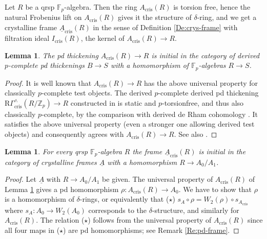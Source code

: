 \documentclass[a4paper,11pt]{amsart}
\theoremstyle{plain}
\newtheorem{Lemma}[equation]{Lemma}
\theoremstyle{definition}
\theoremstyle{remark}
\newcommand{\bLe}{\begin{Lemma}}
\newcommand{\eLe}{\end{Lemma}}
\newcommand{\bproof}{\begin{proof}}
\newcommand{\eproof}{\end{proof}}
\renewcommand{\u}{\underline}
\numberwithin{equation}{section}
\newcommand{\FF}{{\mathbb{F}}}
\newcommand{\ZZ}{{\mathbb{Z}}}
\DeclareMathOperator{\crys}{cris}
\begin{document}
Let $R$ be a qrsp $\FF_p$-algebra. Then the ring $A_{\crys}(R)$ is torsion free, hence the natural Frobenius lift on $A_{\crys}(R)$ gives it the structure of $\delta$-ring, and we get a crystalline frame $\u A_{\crys}(R)$ in the sense of Definition \ref{De:crys-frame} with filtration ideal $I_{\crys}(R)$, the kernel of $A_{\crys}(R)\to R$. 

\bLe
\label{Le:Acrys-universal-derived}
The pd thickening $A_{\crys}(R)\to R$ is initial in the category of derived $p$-complete pd thickenings $B\to S$ with a homomorphism of $\FF_p$-algebras $R\to S$.
\eLe

\bproof
It is well known that $A_{\crys}(R) \to R$ has the above universal property
for classically $p$-complete test objects.
The derived $p$-complete derived pd thickening $\mathrm{R}
\Gamma_{\crys}^{\wedge}(R/\ZZ_p) \to R$ constructed in \cite[Definition
4.3.1 and Example 4.3.3]{Magidson:Divided} is static and $p$-torsionfree, and thus also classically $p$-complete, by the comparison with derived de Rham cohomology
\cite[Corollary 4.3.5.1]{Magidson:Divided}.
It satisfies the above universal property (even a stronger one allowing
derived test objects) and consequently agrees with $A_{\crys}(R) \to R$.
See also \cite[Theorem 8.8]{Mathew:Some-recent}.
\eproof

\bLe
\label{Le:Acris-initial-pd-frame}
For every qrsp $\FF_p$-algebra $R$ the frame $\u A_{\crys}(R)$ is initial in the category of crystalline frames $\u A$ with a homomorphism $R\to A_0/A_1$.
\eLe

\bproof
Let $\u A$ with $R\to A_0/A_1$ be given. The universal property of $A_{\crys}(R)$ of Lemma \ref{Le:Acrys-universal-derived} gives a pd homomorphism $\rho\colon A_{\crys}(R)\to A_0$. We have to show that $\rho$ is a homomorphism of $\delta$-rings, or equivalently that ($\star$) $s_A\circ\rho=W_2(\rho)\circ s_{A_{\crys}}$ where $s_A\colon A_0\to W_2(A_0)$ corresponds to the $\delta$-structure, and similarly for $A_{\crys}(R)$. The relation ($\star$) follows from the universal property of $A_{\crys}(R)$ since all four maps in ($\star$) are pd homomorphisms; see Remark \ref{Re:pd-frame}.
\eproof
\end{document}
